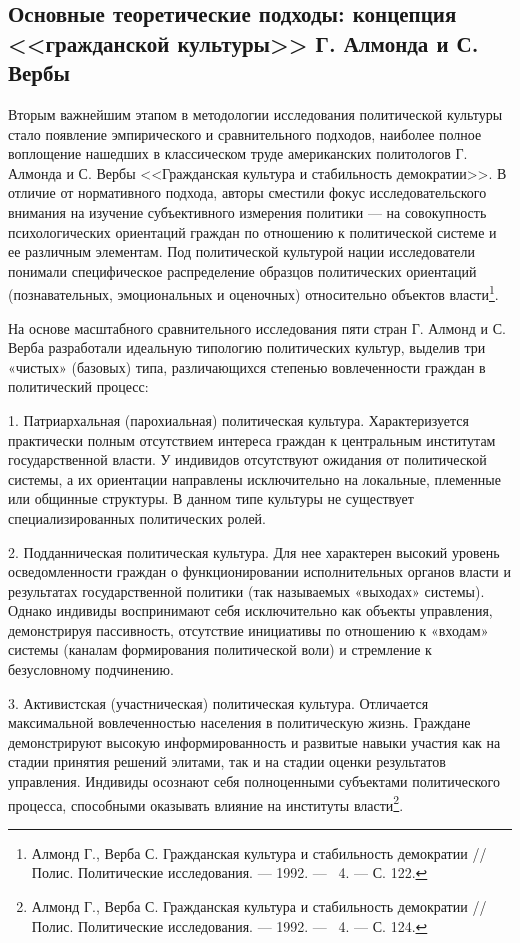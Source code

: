 \subsection{Основные теоретические подходы: концепция <<гражданской культуры>> Г. Алмонда и С. Вербы}

Вторым важнейшим этапом в методологии исследования политической культуры стало появление эмпирического и сравнительного подходов, наиболее полное воплощение нашедших в классическом труде американских политологов Г. Алмонда и С. Вербы <<Гражданская культура и стабильность демократии>>. В отличие от нормативного подхода, авторы сместили фокус исследовательского внимания на изучение субъективного измерения политики --- на совокупность психологических ориентаций граждан по отношению к политической системе и ее различным элементам. Под политической культурой нации исследователи понимали специфическое распределение образцов политических ориентаций (познавательных, эмоциональных и оценочных) относительно объектов власти\footnote{Алмонд Г., Верба С. Гражданская культура и стабильность демократии // Полис. Политические исследования. --- 1992. --- \textnumero~4. --- С. 122.}.

На основе масштабного сравнительного исследования пяти стран Г. Алмонд и С. Верба разработали идеальную типологию политических культур, выделив три «чистых» (базовых) типа, различающихся степенью вовлеченности граждан в политический процесс:

1. Патриархальная (парохиальная) политическая культура. Характеризуется практически полным отсутствием интереса граждан к центральным институтам государственной власти. У индивидов отсутствуют ожидания от политической системы, а их ориентации направлены исключительно на локальные, племенные или общинные структуры. В данном типе культуры не существует специализированных политических ролей.

2. Подданническая политическая культура. Для нее характерен высокий уровень осведомленности граждан о функционировании исполнительных органов власти и результатах государственной политики (так называемых «выходах» системы). Однако индивиды воспринимают себя исключительно как объекты управления, демонстрируя пассивность, отсутствие инициативы по отношению к «входам» системы (каналам формирования политической воли) и стремление к безусловному подчинению.

3. Активистская (участническая) политическая культура. Отличается максимальной вовлеченностью населения в политическую жизнь. Граждане демонстрируют высокую информированность и развитые навыки участия как на стадии принятия решений элитами, так и на стадии оценки результатов управления. Индивиды осознают себя полноценными субъектами политического процесса, способными оказывать влияние на институты власти\footnote{Алмонд Г., Верба С. Гражданская культура и стабильность демократии // Полис. Политические исследования. --- 1992. --- \textnumero~4. --- С. 124.}.

